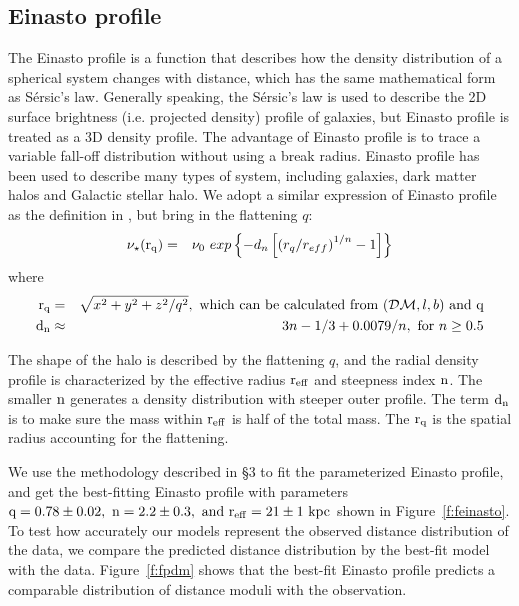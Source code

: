 \documentclass[12pt,preprint]{aastex}
\newcommand{\DM}{\mathcal{DM}}
\begin{document}
\subsection{Einasto profile}
The Einasto profile\citep{Einasto1989} is a function that describes how the density distribution of a spherical system changes with distance, which has the same mathematical form as S{\'e}rsic's law\citep{Sersic1963}. Generally speaking, the S{\'e}rsic's law is used to describe the 2D surface brightness (i.e. projected density) profile of galaxies, but Einasto profile is treated as a 3D density profile. The advantage of Einasto profile is to trace a variable fall-off distribution without using a break radius. Einasto profile has been used to describe many types of system, including galaxies\citep{Einasto1989}, dark matter halos\citep{Merritt2006,Graham2006,Navarro2010} and Galactic stellar halo\citep{Sesar2011,Deason2011}. We adopt a similar expression of Einasto profile as the definition in \citet{Merritt2006}, but bring in the flattening $q$:
\begin{eqnarray}
\rm \nu_{\star}(r_q) &=& \nu_0~exp\left\{-d_n\left[\left(r_q/r_{eff}\right )^{1/n}-1\right ]\right\}
 \end{eqnarray}
where 
\begin{eqnarray*}
\rm r_q &=& \sqrt{x^2+y^2+z^2/q^2}, \mbox{ which can be calculated from $\left(\DM,l,b \right)$ and q}   \nonumber \\ 
\rm d_n &\approx& 3n-1/3+0.0079/n,  \mbox{ for } n \ge 0.5 \nonumber 
\end{eqnarray*}

The shape of the halo is described by the flattening $q$, and the radial density profile is characterized by the effective radius $\rm r_{eff}$ and steepness index $\rm n$. The smaller $\rm n$ generates a density distribution with steeper outer profile. The term $\rm d_n$ is to make sure the mass within $\rm r_{eff}$ is half of the total mass. The $\rm r_q$ is the spatial radius accounting for the flattening. 

We use the methodology described in \S 3 to fit the parameterized Einasto profile, and get the best-fitting Einasto profile with parameters $\rm q=0.78\pm0.02,~n=2.2\pm0.3,~and ~r_{eff}=21\pm1~kpc$ shown in Figure~\ref{f:feinasto}. To test how accurately our models represent the observed distance distribution of the data, we compare the predicted distance distribution by the best-fit model with the data. Figure~\ref{f:fpdm} shows that the best-fit Einasto profile predicts a comparable distribution of distance moduli with the observation. 
\end{document}
